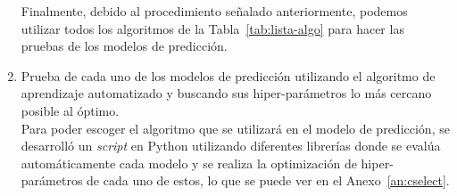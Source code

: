 \begin{enumerate}
Finalmente, debido al procedimiento señalado anteriormente, podemos utilizar todos los algoritmos de la Tabla~\ref{tab:lista-algo} para hacer las pruebas de los modelos de predicción.


\item Prueba de cada uno de los modelos de predicción utilizando el algoritmo de aprendizaje automatizado y buscando sus hiper-parámetros lo más cercano posible al óptimo. \\ \hfill
Para poder escoger el algoritmo que se utilizará en el modelo de predicción, se desarrolló un \textit{script} en Python utilizando diferentes librerías donde se evalúa automáticamente cada modelo y se realiza la optimización de hiper-parámetros de cada uno de estos, lo que se puede ver en el Anexo~\ref{an:cselect}.


\end{enumerate}
